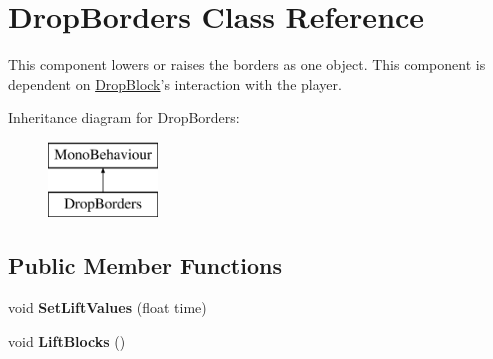 \hypertarget{class_drop_borders}{\section{Drop\+Borders Class Reference}
\label{class_drop_borders}
}


This component lowers or raises the borders as one object. This component is dependent on \hyperlink{class_drop_block}{Drop\+Block}'s interaction with the player.  


Inheritance diagram for Drop\+Borders\+:\begin{figure}[H]
\begin{center}
\leavevmode
\includegraphics[height=2.000000cm]{class_drop_borders}
\end{center}
\end{figure}
\subsection*{Public Member Functions}
\begin{DoxyCompactItemize}
\item 
\hypertarget{class_drop_borders_a496db05538c10dddd1399bd77bb8f11d}{void {\bfseries Set\+Lift\+Values} (float time)}\label{class_drop_borders_a496db05538c10dddd1399bd77bb8f11d}

\item 
\hypertarget{class_drop_borders_a4d6ea1934875e48ed596c77c7df768a9}{void {\bfseries Lift\+Blocks} ()}\label{class_drop_borders_a4d6ea1934875e48ed596c77c7df768a9}

\end{DoxyCompactItemize}
